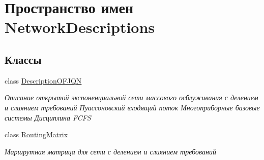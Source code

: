 \hypertarget{namespace_network_descriptions}{}\section{Пространство имен Network\+Descriptions}
\label{namespace_network_descriptions}
\subsection*{Классы}
\begin{DoxyCompactItemize}
\item 
class \hyperlink{class_network_descriptions_1_1_description_o_f_j_q_n}{Description\+O\+F\+J\+QN}
\begin{DoxyCompactList}\small\item\em Описание открытой экспоненциальной сети массового осблуживания с делением и слиянием требований Пуассоновский входящий поток Многоприборные базовые системы Дисциплина F\+C\+FS \end{DoxyCompactList}\item 
class \hyperlink{class_network_descriptions_1_1_routing_matrix}{Routing\+Matrix}
\begin{DoxyCompactList}\small\item\em Маршрутная матрица для сети с делением и слиянием требований \end{DoxyCompactList}\end{DoxyCompactItemize}
